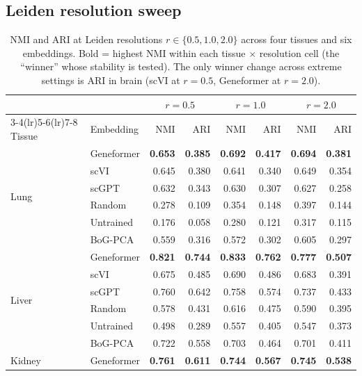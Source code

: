 \documentclass[10pt,letterpaper]{article}
\begin{document}
\subsection{Leiden resolution sweep}

\begin{table}[h!]
\centering
\caption{NMI and ARI at Leiden resolutions $r \in \{0.5, 1.0, 2.0\}$ across four tissues and six embeddings. Bold = highest NMI within each tissue $\times$ resolution cell (the ``winner'' whose stability is tested). The only winner change across extreme settings is ARI in brain (scVI at $r=0.5$, Geneformer at $r=2.0$).}
\label{tab:app_leiden}
\scriptsize
\begin{tabular}{@{}ll rr rr rr@{}}
\toprule
 & & \multicolumn{2}{c}{$r = 0.5$} & \multicolumn{2}{c}{$r = 1.0$} & \multicolumn{2}{c}{$r = 2.0$} \\
\cmidrule(lr){3-4}\cmidrule(lr){5-6}\cmidrule(lr){7-8}
Tissue & Embedding & NMI & ARI & NMI & ARI & NMI & ARI \\
\midrule
\multirow{6}{*}{Lung}
 & Geneformer & \textbf{0.653} & \textbf{0.385} & \textbf{0.692} & \textbf{0.417} & \textbf{0.694} & \textbf{0.381} \\
 & scVI       & 0.645 & 0.380 & 0.641 & 0.340 & 0.649 & 0.354 \\
 & scGPT      & 0.632 & 0.343 & 0.630 & 0.307 & 0.627 & 0.258 \\
 & Random     & 0.278 & 0.109 & 0.354 & 0.148 & 0.397 & 0.144 \\
 & Untrained  & 0.176 & 0.058 & 0.280 & 0.121 & 0.317 & 0.115 \\
 & BoG-PCA    & 0.559 & 0.316 & 0.572 & 0.302 & 0.605 & 0.297 \\
\midrule
\multirow{6}{*}{Liver}
 & Geneformer & \textbf{0.821} & \textbf{0.744} & \textbf{0.833} & \textbf{0.762} & \textbf{0.777} & \textbf{0.507} \\
 & scVI       & 0.675 & 0.485 & 0.690 & 0.486 & 0.683 & 0.391 \\
 & scGPT      & 0.760 & 0.642 & 0.758 & 0.574 & 0.737 & 0.433 \\
 & Random     & 0.578 & 0.431 & 0.616 & 0.475 & 0.590 & 0.395 \\
 & Untrained  & 0.498 & 0.289 & 0.557 & 0.405 & 0.547 & 0.373 \\
 & BoG-PCA    & 0.722 & 0.558 & 0.703 & 0.464 & 0.701 & 0.411 \\
\midrule
\multirow{6}{*}{Kidney}
 & Geneformer & \textbf{0.761} & \textbf{0.611} & \textbf{0.744} & \textbf{0.567} & \textbf{0.745} & \textbf{0.538} \\

\end{tabular}
\end{table}
\end{document}
